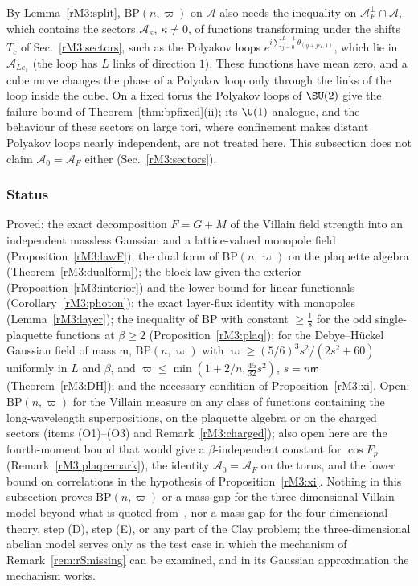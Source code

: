 \begin{remark}\label{rM3:charged}
By Lemma~\ref{rM3:split}, $\mathrm{BP}(n,\varpi)$ on $\mathcal A$ also needs
the inequality on $\mathcal A_F^\perp\cap\mathcal A$, which contains the
sectors $\mathcal A_\kappa$, $\kappa\ne0$, of functions transforming under
the shifts $T_c$ of Sec.~\ref{rM3:sectors}, such as the Polyakov loops
$e^{i\sum_{j=0}^{L-1}\theta_{(y+je_1,1)}}$, which lie in $\mathcal
A_{Le_1}$ (the loop has $L$ links of direction $1$). These
functions have mean zero, and a cube move changes the phase of a Polyakov
loop only through the links of the loop inside the cube. On a fixed torus
the Polyakov loops of $\SU(2)$ give the failure bound of
Theorem~\ref{thm:bpfixed}(ii); its $\U(1)$ analogue, and the behaviour of
these sectors on large tori, where confinement makes distant Polyakov
loops nearly independent, are not treated here. This subsection does not
claim $\mathcal A_0=\mathcal A_F$ either (Sec.~\ref{rM3:sectors}).
\end{remark}

\subsubsection{Status}\label{rM3:status}

Proved: the exact decomposition $F=G+M$ of the Villain field strength into
an independent massless Gaussian and a lattice-valued monopole field
(Proposition~\ref{rM3:lawF}); the dual form of $\mathrm{BP}(n,\varpi)$ on
the plaquette algebra (Theorem~\ref{rM3:dualform}); the block law given the
exterior (Proposition~\ref{rM3:interior}) and the lower bound for linear
functionals (Corollary~\ref{rM3:photon}); the exact layer-flux identity
with monopoles (Lemma~\ref{rM3:layer}); the inequality of $\mathrm{BP}$
with constant $\ge\frac18$ for the odd single-plaquette functions at $\beta
\ge2$ (Proposition~\ref{rM3:plaq}); for the Debye--H\"uckel Gaussian field of
mass $\mathsf m$, $\mathrm{BP}(n,\varpi)$ with $\varpi\ge(5/6)^3s^2/(2s^2+60)$
uniformly in $L$ and $\beta$, and $\varpi\le\min(1+2/n,\frac{45}{32}s^2)$,
$s=n\mathsf m$ (Theorem~\ref{rM3:DH}); and the necessary condition of
Proposition~\ref{rM3:xi}. Open: $\mathrm{BP}(n,\varpi)$ for the Villain
measure on any class of functions containing the long-wavelength
superpositions, on the plaquette algebra or on the charged sectors (items
(O1)--(O3) and Remark~\ref{rM3:charged}); also open here are the
fourth-moment bound that would give a $\beta$-independent constant for
$\cos F_p$ (Remark~\ref{rM3:plaqremark}), the identity $\mathcal A_0=
\mathcal A_F$ on the torus, and the lower bound on correlations in the
hypothesis of Proposition~\ref{rM3:xi}. Nothing in this subsection proves
$\mathrm{BP}(n,\varpi)$ or a mass gap for the three-dimensional Villain
model beyond what is quoted from~\cite{GM82}, nor a mass gap for the
four-dimensional theory, step (D), step (E), or any part of the Clay
problem; the three-dimensional abelian model serves only as the test case
in which the mechanism of Remark~\ref{rem:rSmissing} can be examined, and
in its Gaussian approximation the mechanism works.
